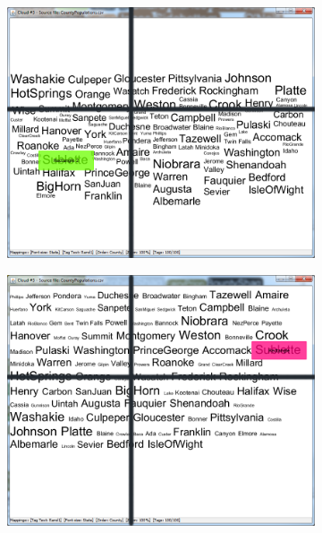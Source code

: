 \begin{figure}[!htb]
\begin{subfigure}{.5\textwidth}
  \includegraphics[scale=0.25]{Experiment2/T3/M1Spiral.png}
\end{subfigure}%
\begin{subfigure}{.5\textwidth}
  \centering
  \includegraphics[scale=0.25]{Experiment2/T3/M1Typewriter.png}
\end{subfigure}
\begin{subfigure}{.5\textwidth}
  \centering

\end{subfigure}
\end{figure}
